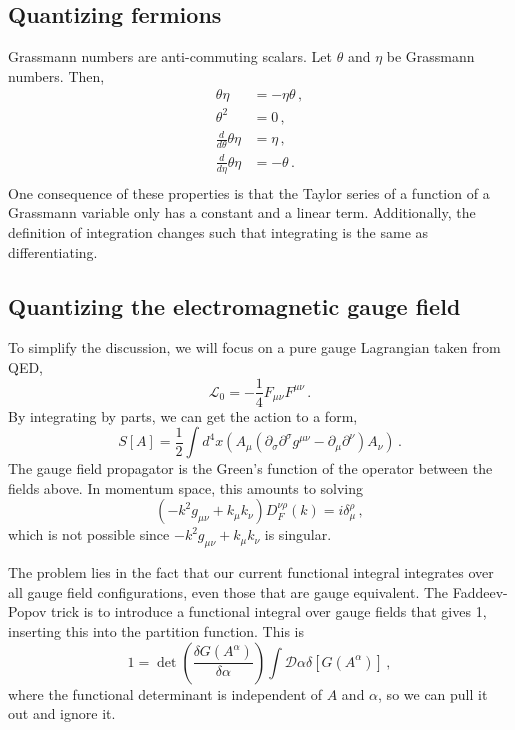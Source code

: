 \documentclass[12pt]{memoir}
\begin{document}
\subsection{Quantizing fermions}

Grassmann numbers are anti-commuting scalars.
Let $\theta$ and $\eta$ be Grassmann numbers.
Then,
\begin{align}
  \theta \eta & = - \eta \theta\,, \\
  \theta^2 & = 0\,, \\
  \frac{d}{d\theta}\theta\eta & = \eta\,,\\
  \frac{d}{d\eta}\theta\eta & = -\theta\,.\\
\end{align}
One consequence of these properties is that the Taylor series of a function of a Grassmann variable
only has a constant and a linear term.
Additionally, the definition of integration changes such that integrating is the same as differentiating.

\subsection{Quantizing the electromagnetic gauge field}

To simplify the discussion, we will focus on a pure gauge Lagrangian taken from QED,
\begin{equation}
  \mathcal{L}_0 = -\frac{1}{4} F_{\mu\nu}F^{\mu\nu}\,.
\end{equation}
By integrating by parts, we can get the action to a form,
\begin{equation}
  S[A] = \frac{1}{2}\int d^4 x (A_{\mu} (\partial_{\sigma} \partial^{\sigma} g^{\mu\nu} - \partial_{\mu} \partial^{\nu}) A_{\nu})\,.
\end{equation}
The gauge field propagator is the Green's function of the operator between the fields above.
In momentum space, this amounts to solving
\begin{equation}
  (-k^2 g_{\mu\nu} + k_{\mu} k_{\nu}) D_{F}^{\nu\rho}(k) = i \delta_{\mu}^{\rho}\,,
\end{equation}
which is not possible since $-k^2 g_{\mu\nu} + k_{\mu} k_{\nu}$ is singular.

The problem lies in the fact that our current functional integral integrates over all gauge field configurations,
even those that are gauge equivalent.
The Faddeev-Popov trick is to introduce a functional integral over gauge fields that gives 1,
inserting this into the partition function.
This is
\begin{equation}
  1 = \det\left(\frac{\delta G(A^{\alpha})}{\delta \alpha}\right) \int \mathcal{D}\alpha \delta [G(A^{\alpha})]\,,
\end{equation}
where the functional determinant is independent of $A$ and $\alpha$, so we can pull it out and ignore it.
\end{document}
